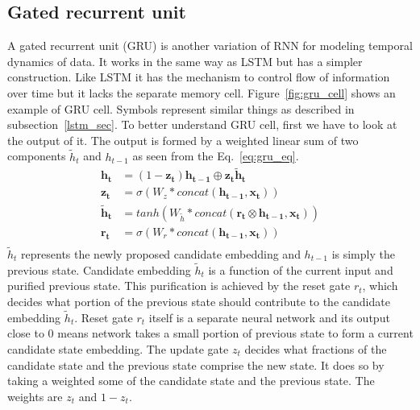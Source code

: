 \documentclass[10pt,twocolumn,letterpaper]{article}
\begin{document}
\subsection{Gated recurrent unit}
A gated recurrent unit (GRU) is another variation of RNN for modeling temporal dynamics of data. It works in the same way as LSTM
but has a simpler construction. Like LSTM it has the mechanism to control flow of information over time but it lacks the separate memory cell. 
Figure~\ref{fig:gru_cell} shows an example of GRU cell. Symbols represent similar things as described in subsection~\ref{lstm_sec}. 
To better understand GRU cell, first we have to look at the output of it. The output is formed by a weighted linear sum of two components $\tilde{h}_t$ and $h_{t-1}$ as seen from the Eq.~\ref{eq:gru_eq}. 
\begin{equation}
	\label{eq:gru_eq}
	\begin{aligned}
		\mathbf{h_t} & = (1-\mathbf{z_{t}})\mathbf{h_{t-1}} \oplus \mathbf{z_{t}}\mathbf{\tilde{h}_t} \\
		\mathbf{z_{t}} &= \sigma(W_z*concat(\mathbf{h_{t-1}}, \mathbf{x_t})) \\
		\mathbf{\tilde{h}_t} &= tanh(W_{\tilde{h}}*concat(\mathbf{r_t} \otimes \mathbf{h_{t-1}}, \mathbf{x_t})) \\
		\mathbf{r_t} &= \sigma(W_r*concat(\mathbf{h_{t-1}}, \mathbf{x_t})) \\
	\end{aligned}
\end{equation}
$\tilde{h}_t$ represents the 
newly proposed candidate embedding and $h_{t-1}$ is simply the previous state. Candidate embedding $\tilde{h}_t$ is a function of the current input and purified previous state. This purification is achieved by the reset gate $r_{t}$, which decides
what portion of the 
previous state should contribute to the 
candidate embedding $\tilde{h}_t$. Reset gate $r_{t}$ itself is a separate neural network and its output close to 0 means network takes a small portion of previous state to form a current candidate state embedding. The update gate $z_{t}$ decides what fractions of the candidate state and the previous state comprise the new state. It does so by taking a weighted some of the candidate state and the previous state. The weights are $z_{t}$ and $1-z_{t}$. %
\end{document}
